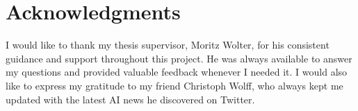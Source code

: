



\bigskip

\begingroup
\let\clearpage\relax
\let\cleardoublepage\relax
\let\cleardoublepage\relax
\chapter*{Acknowledgments}
I would like to thank my thesis supervisor, Moritz Wolter, for his consistent guidance and support throughout this project.
He was always available to answer my questions and provided valuable feedback whenever I needed it.
I would also like to express my gratitude to my friend Christoph Wolff, who always kept me updated with the latest AI news he discovered on Twitter.
\bigskip

\endgroup
